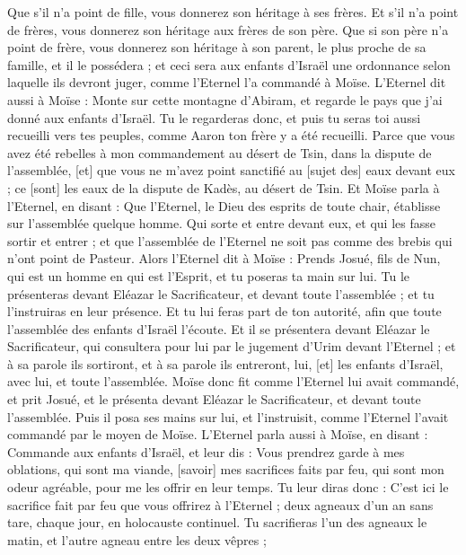 \begin{multicols}{2}
Que s'il n'a point de fille, vous donnerez son héritage à ses frères.
Et s'il n'a point de frères, vous donnerez son héritage aux frères de son père.
Que si son père n'a point de frère, vous donnerez son héritage à son parent, le plus proche de sa famille, et il le possédera ; et ceci sera aux enfants d'Israël une ordonnance selon laquelle ils devront juger, comme l'Eternel l'a commandé à Moïse.
L'Eternel dit aussi à Moïse : Monte sur cette montagne d'Abiram, et regarde le pays que j'ai donné aux enfants d'Israël.
Tu le regarderas donc, et puis tu seras toi aussi recueilli vers tes peuples, comme Aaron ton frère y a été recueilli.
Parce que vous avez été rebelles à mon commandement au désert de Tsin, dans la dispute de l'assemblée, [et] que vous ne m'avez point sanctifié au [sujet des] eaux devant eux ; ce [sont] les eaux de la dispute de Kadès, au désert de Tsin.
Et Moïse parla à l'Eternel, en disant :
Que l'Eternel, le Dieu des esprits de toute chair, établisse sur l'assemblée quelque homme.
Qui sorte et entre devant eux, et qui les fasse sortir et entrer ; et que l'assemblée de l'Eternel ne soit pas comme des brebis qui n'ont point de Pasteur.
Alors l'Eternel dit à Moïse : Prends Josué, fils de Nun, qui est un homme en qui est l'Esprit, et tu poseras ta main sur lui.
Tu le présenteras devant Eléazar le Sacrificateur, et devant toute l'assemblée ; et tu l'instruiras en leur présence.
Et tu lui feras part de ton autorité, afin que toute l'assemblée des enfants d'Israël l'écoute.
Et il se présentera devant Eléazar le Sacrificateur, qui consultera pour lui par le jugement d'Urim devant l'Eternel ; et à sa parole ils sortiront, et à sa parole ils entreront, lui, [et] les enfants d'Israël, avec lui, et toute l'assemblée.
Moïse donc fit comme l'Eternel lui avait commandé, et prit Josué, et le présenta devant Eléazar le Sacrificateur, et devant toute l'assemblée.
Puis il posa ses mains sur lui, et l'instruisit, comme l'Eternel l'avait commandé par le moyen de Moïse.
\VerseOne{}L'Eternel parla aussi à Moïse, en disant :
Commande aux enfants d'Israël, et leur dis : Vous prendrez garde à mes oblations, qui sont ma viande, [savoir] mes sacrifices faits par feu, qui sont mon odeur agréable, pour me les offrir en leur temps.
Tu leur diras donc : C'est ici le sacrifice fait par feu que vous offrirez à l'Eternel ; deux agneaux d'un an sans tare, chaque jour, en holocauste continuel.
Tu sacrifieras l'un des agneaux le matin, et l'autre agneau entre les deux vêpres ;

\end{multicols}

